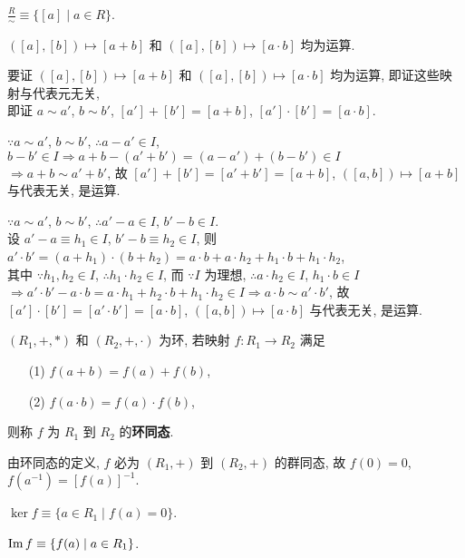 \documentclass{note}
\begin{document}
\begin{df}[商环]
    $\frac{R}{\sim}\equiv\{[a]\mid a\in R\}$.
\end{df}

$([a],[b])\mapsto[a+b]$ 和 $([a],[b])\mapsto[a\cdot b]$ 均为运算.
\begin{pf}
    要证 $([a],[b])\mapsto[a+b]$ 和 $([a],[b])\mapsto[a\cdot b]$ 均为运算, 即证这些映射与代表元无关,\\
    即证 $a\sim a'$, $b\sim b'$, $[a']+[b']=[a+b]$, $[a']\cdot[b']=[a\cdot b]$.

    $\because a\sim a'$, $b\sim b'$, $\therefore a-a'\in I$, $b-b'\in I\Longrightarrow a+b-(a'+b')=(a-a')+(b-b')\in I$\\
    $\Longrightarrow a+b\sim a'+b'$, 故 $[a']+[b']=[a'+b']=[a+b]$, $([a,b])\mapsto[a+b]$ 与代表无关, 是运算.

    $\because a\sim a'$, $b\sim b'$, $\therefore a'-a\in I$, $b'-b\in I$.\\
    设 $a'-a\equiv h_1\in I$, $b'-b\equiv h_2\in I$, 则 $a'\cdot b'=(a+h_1)\cdot(b+h_2)=a\cdot b+a\cdot h_2+h_1\cdot b+h_1\cdot h_2$,\\
    其中 $\because h_1,h_2\in I$, $\therefore h_1\cdot h_2\in I$, 而 $\because I$ 为理想, $\therefore a\cdot h_2\in I$, $h_1\cdot b\in I$\\
    $\Longrightarrow a'\cdot b'-a\cdot b=a\cdot h_1+h_2\cdot b+h_1\cdot h_2\in I\Longrightarrow a\cdot b\sim a'\cdot b'$, 故 $[a']\cdot[b']=[a'\cdot b']=[a\cdot b]$, $([a,b])\mapsto[a\cdot b]$ 与代表无关, 是运算.
\end{pf}

\begin{df}[环同态]
    $(R_1,+,*)$ 和 $(R_2,+,\cdot)$ 为环, 若映射 $f:R_1\rightarrow R_2$ 满足
    \begin{itemize}
        \item[(1)] $f(a+b)=f(a)+f(b)$,
        \item[(2)] $f(a\cdot b)=f(a)\cdot f(b)$,
    \end{itemize}
    则称 $f$ 为 $R_1$ 到 $R_2$ 的\textbf{环同态}.
\end{df}

由环同态的定义, $f$ 必为 $(R_1,+)$ 到 $(R_2,+)$ 的群同态, 故 $f(0)=0$, $f(a^{-1})=[f(a)]^{-1}$.

\begin{df}[核]
    $\ker f\equiv\{a\in R_1\mid f(a)=0\}$.
\end{df}

\begin{df}[像]
    $\operatorname{Im} f\equiv\{f(a)\mid a\in R_1\}$.
\end{df}
\end{document}
